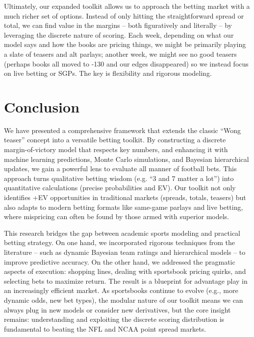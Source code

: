 \documentclass[11pt]{amsart}
\begin{document}
Ultimately, our expanded toolkit allows us to approach the betting market with a much richer set of options. Instead of only hitting the straightforward spread or total, we can find value in the margins – both figuratively and literally – by leveraging the discrete nature of scoring. Each week, depending on what our model says and how the books are pricing things, we might be primarily playing a slate of teasers and alt parlays; another week, we might see no good teasers (perhaps books all moved to -130 and our edges disappeared) so we instead focus on live betting or SGPs. The key is flexibility and rigorous modeling.

\section{Conclusion}
We have presented a comprehensive framework that extends the classic “Wong teaser” concept into a versatile betting toolkit. By constructing a discrete margin-of-victory model that respects key numbers, and enhancing it with machine learning predictions, Monte Carlo simulations, and Bayesian hierarchical updates, we gain a powerful lens to evaluate all manner of football bets. This approach turns qualitative betting wisdom (e.g. “3 and 7 matter a lot”) into quantitative calculations (precise probabilities and EV). Our toolkit not only identifies +EV opportunities in traditional markets (spreads, totals, teasers) but also adapts to modern betting formats like same-game parlays and live betting, where mispricing can often be found by those armed with superior models.

This research bridges the gap between academic sports modeling and practical betting strategy. On one hand, we incorporated rigorous techniques from the literature – such as dynamic Bayesian team ratings \citep{Macri2025} and hierarchical models \citep{Baio2010} – to improve predictive accuracy. On the other hand, we addressed the pragmatic aspects of execution: shopping lines, dealing with sportsbook pricing quirks, and selecting bets to maximize return. The result is a blueprint for advantage play in an increasingly efficient market. As sportsbooks continue to evolve (e.g., more dynamic odds, new bet types), the modular nature of our toolkit means we can always plug in new models or consider new derivatives, but the core insight remains: understanding and exploiting the discrete scoring distribution is fundamental to beating the NFL and NCAA point spread markets.
\end{document}
